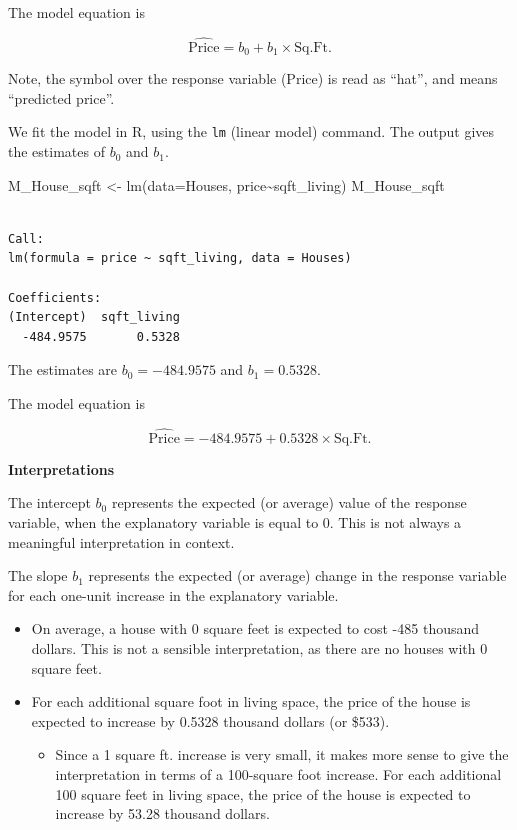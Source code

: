 \documentclass[
  letterpaper,
  DIV=11,
  numbers=noendperiod]{scrreprt}
\newenvironment{Shaded}{\begin{snugshade}}{\end{snugshade}}
\newcommand{\AttributeTok}[1]{\textcolor[rgb]{0.40,0.45,0.13}{#1}}
\newcommand{\FunctionTok}[1]{\textcolor[rgb]{0.28,0.35,0.67}{#1}}
\newcommand{\NormalTok}[1]{\textcolor[rgb]{0.00,0.23,0.31}{#1}}
\newcommand{\OtherTok}[1]{\textcolor[rgb]{0.00,0.23,0.31}{#1}}
\newcommand{\SpecialCharTok}[1]{\textcolor[rgb]{0.37,0.37,0.37}{#1}}
\providecommand{\tightlist}{%
  \setlength{\itemsep}{0pt}\setlength{\parskip}{0pt}}\usepackage{longtable,booktabs,array}
\begin{document}
The model equation is

\[
\widehat{\text{Price}} = b_0 + b_1\times\text{Sq.Ft.}
\]

Note, the symbol over the response variable (Price) is read as ``hat'',
and means ``predicted price''.

We fit the model in R, using the \texttt{lm} (linear model) command. The
output gives the estimates of \(b_0\) and \(b_1\).

\begin{Shaded}
\begin{Highlighting}[]
\NormalTok{M\_House\_sqft }\OtherTok{\textless{}{-}} \FunctionTok{lm}\NormalTok{(}\AttributeTok{data=}\NormalTok{Houses, price}\SpecialCharTok{\textasciitilde{}}\NormalTok{sqft\_living)}
\NormalTok{M\_House\_sqft}
\end{Highlighting}
\end{Shaded}

\begin{verbatim}

Call:
lm(formula = price ~ sqft_living, data = Houses)

Coefficients:
(Intercept)  sqft_living  
  -484.9575       0.5328  
\end{verbatim}

The estimates are \(b_0=-484.9575\) and \(b_1=0.5328\).

The model equation is

\[
\widehat{\text{Price}} = -484.9575 + 0.5328\times\text{Sq.Ft.}
\]

\textbf{Interpretations}

The intercept \(b_0\) represents the expected (or average) value of the
response variable, when the explanatory variable is equal to 0. This is
not always a meaningful interpretation in context.

The slope \(b_1\) represents the expected (or average) change in the
response variable for each one-unit increase in the explanatory
variable.

\begin{itemize}
\item
  On average, a house with 0 square feet is expected to cost -485
  thousand dollars. This is not a sensible interpretation, as there are
  no houses with 0 square feet.
\item
  For each additional square foot in living space, the price of the
  house is expected to increase by 0.5328 thousand dollars (or \$533).\\

  \begin{itemize}
  \tightlist
  \item
    Since a 1 square ft. increase is very small, it makes more sense to
    give the interpretation in terms of a 100-square foot increase. For
    each additional 100 square feet in living space, the price of the
    house is expected to increase by 53.28 thousand dollars.
  \end{itemize}
\end{itemize}
\end{document}
